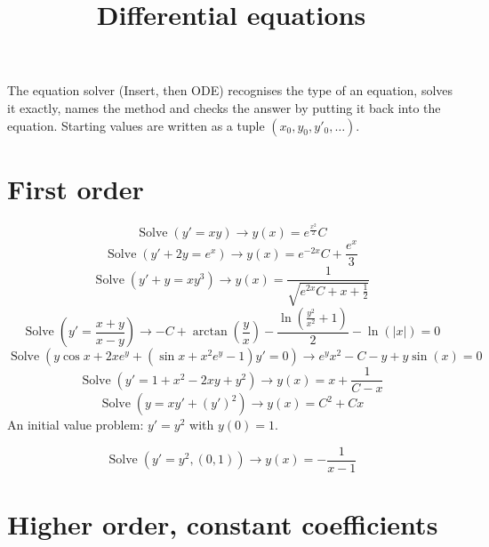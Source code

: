 \documentclass[11pt,a4paper]{article}
\title{Differential equations}
\date{}
\theoremstyle{plain}
\theoremstyle{definition}
\theoremstyle{remark}
\begin{document}
\maketitle
The equation solver (Insert, then ODE) recognises the type of an equation, solves it exactly, names the method and checks the answer by putting it back into the equation. Starting values are written as a tuple $(x_0, y_0, y'_0, \dots)$.

\section*{First order}

\begin{equation*}
  \operatorname{Solve}(y' = x y) \to y\left(x\right) = e^{\frac{x^{2}}{2}} C
\end{equation*}
\begin{equation*}
  \operatorname{Solve}(y' + 2y = e^x) \to y\left(x\right) = e^{-2 x} C + \frac{e^{x}}{3}
\end{equation*}
\begin{equation*}
  \operatorname{Solve}(y' + y = x y^3) \to y\left(x\right) = \frac{1}{\sqrt{e^{2 x} C + x + \frac{1}{2}}}
\end{equation*}
\begin{equation*}
  \operatorname{Solve}(y' = \frac{x + y}{x - y}) \to -C + \arctan\left(\frac{y}{x}\right) - \frac{\ln\left(\frac{y^{2}}{x^{2}} + 1\right)}{2} - \ln\left(\left|x\right|\right) = 0
\end{equation*}
\begin{equation*}
  \operatorname{Solve}(y \cos x + 2x e^y + (\sin x + x^2 e^y - 1) y' = 0) \to e^{y} x^{2} - C - y + y \sin\left(x\right) = 0
\end{equation*}
\begin{equation*}
  \operatorname{Solve}(y' = 1 + x^2 - 2 x y + y^2) \to y\left(x\right) = x + \frac{1}{C - x}
\end{equation*}
\begin{equation*}
  \operatorname{Solve}(y = x y' + (y')^2) \to y\left(x\right) = C^{2} + C x
\end{equation*}
An initial value problem: $y' = y^2$ with $y(0) = 1$.

\begin{equation*}
  \operatorname{Solve}(y' = y^2, (0, 1)) \to y\left(x\right) = -\frac{1}{x - 1}
\end{equation*}
\section*{Higher order, constant coefficients}
\end{document}
